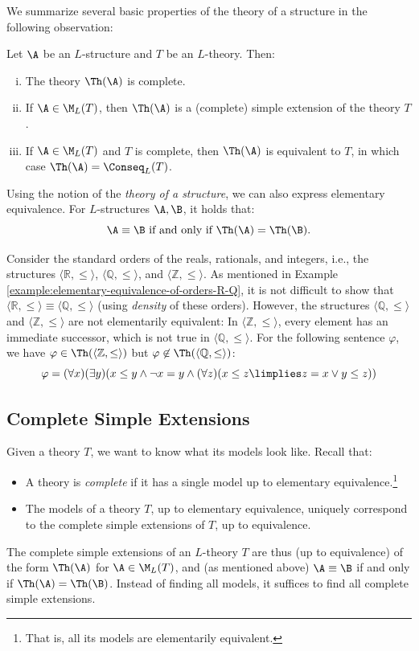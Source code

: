 We summarize several basic properties of the theory of a structure in the following observation:

\begin{observation}
    Let $\A$ be an $L$-structure and $T$ be an $L$-theory. Then:
    \begin{enumerate}[(i)]
        \item The theory $\Th(\A)$ is complete.
        \item If $\A\in\M_L(T)$, then $\Th(\A)$ is a (complete) simple extension of the theory $T$.
        \item If $\A\in\M_L(T)$ and $T$ is complete, then $\Th(\A)$ is equivalent to $T$, in which case $\Th(\A)=\Conseq_L(T)$.
    \end{enumerate}    
\end{observation}

Using the notion of the \emph{theory of a structure}, we can also express elementary equivalence. For $L$-structures $\A,\B$, it holds that:
$$
\A\equiv\B \text{ if and only if }\Th(\A)=\Th(\B).
$$

\begin{example}
   Consider the standard orders of the reals, rationals, and integers, i.e., the structures $\langle\mathbb{R},\leq\rangle$, $\langle\mathbb{Q},\leq\rangle$, and $\langle\mathbb{Z},\leq\rangle$. As mentioned in Example \ref{example:elementary-equivalence-of-orders-R-Q}, it is not difficult to show that $\langle\mathbb{R},\leq\rangle\equiv\langle\mathbb{Q},\leq\rangle$ (using \emph{density} of these orders). However, the structures $\langle\mathbb{Q},\leq\rangle$ and $\langle\mathbb{Z},\leq\rangle$ are not elementarily equivalent: In $\langle\mathbb{Z},\leq\rangle$, every element has an immediate successor, which is not true in $\langle\mathbb{Q},\leq\rangle$. For the following sentence $\varphi$, we have $\varphi\in\Th(\langle\mathbb{Z},\leq\rangle)$ but $\varphi\not\in\Th(\langle\mathbb{Q},\leq\rangle)$:
   $$
   \varphi=(\forall x)(\exists y)(x\leq y \land \neg x=y \land (\forall z)(x\leq z \limplies z=x\lor y\leq z))
   $$
\end{example}

\subsection{Complete Simple Extensions}

Given a theory $T$, we want to know what its models look like. Recall that:
\begin{itemize}
    \item A theory is \emph{complete} if it has a single model up to elementary equivalence.\footnote{That is, all its models are elementarily equivalent.}
    \item The models of a theory $T$, up to elementary equivalence, uniquely correspond to the complete simple extensions of $T$, up to equivalence.
\end{itemize}
The complete simple extensions of an $L$-theory $T$ are thus (up to equivalence) of the form $\Th(\A)$ for $\A\in\M_L(T)$, and (as mentioned above) $\A\equiv\B$ if and only if $\Th(\A)=\Th(\B)$. Instead of finding all models, it suffices to find all complete simple extensions.

